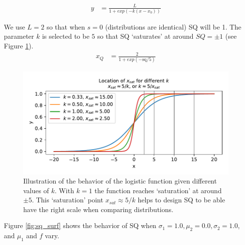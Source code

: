 \begin{align}
    y &= \frac{L}{1+exp(-k(x-x_0))} \label{eq:get_log}
\end{align}

We use $L=2$ so that when $s=0$ (distributions are identical) SQ will be 1. The parameter $k$ is selected to be $5$ so that SQ `saturates' at around $SQ=\pm1$ (see Figure \ref{fig:log_sat}).
\begin{align}
    x_{Q} &= \frac{2}{1+exp(-\text{sq}/5)}\label{eq:SQ}
\end{align}
\begin{figure}[tbp]
    \centering
    \includegraphics[width=0.9\linewidth]{Figures/logistic_saturation}
    \caption{Illustration of the behavior of the logistic function given different values of $k$. With $k=1$ the function reaches `saturation' at around $\pm5$. This `saturation' point $x_{sat}\approx 5/k$ helps to design SQ to be able have the right scale when comparing distributions.}
    \label{fig:log_sat}
\end{figure}

Figure \ref{fig:sq_surf} shows the behavior of SQ when $\sigma_1=1.0,\mu_2=0.0,\sigma_2=1.0$, and $\mu_1$ and $f$ vary.

